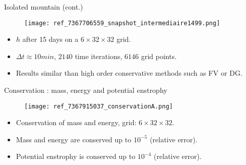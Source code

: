 \documentclass[11pt]{beamer}
\begin{document}


\begin{frame}{Isolated mountain (cont.)}
\begin{figure}
\texttt{[image: ref\_7367706559\_snapshot\_intermediaire1499.png]}
\end{figure}
\begin{itemize}
\item $h$ after 15 days on a $6 \times 32 \times 32$ grid.
\item $\Delta t \approx 10min$, $2140$ time iterations, $6146$ grid points.
\item Results similar than high order conservative methods such as FV or DG.
\end{itemize}
\end{frame}


\begin{frame}{Conservation : mass, energy and potential enstrophy}
\begin{figure}
\texttt{[image: ref\_7367915037\_conservationA.png]}
\end{figure}
\begin{itemize}
\item Conservation of mass and energy, grid: $6 \times 32 \times 32$.
\item Mass and energy are conserved up to $10^{-5}$ (relative error).
\item Potential enstrophy is conserved up to $10^{-4}$ (relative error).
\end{itemize}
\end{frame}

\end{document}
